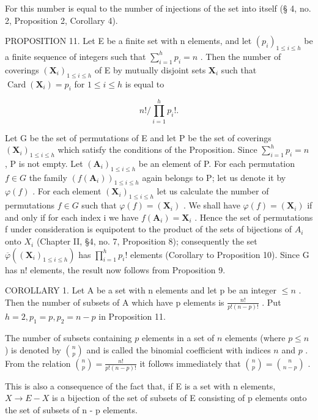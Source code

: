 For this number is equal to the number of injections of the set into itself (§ 4, no. 2, Proposition 2, Corollary 4).

PROPOSITION 11. Let E be a finite set with n elements, and let \((p_i)_{1 \leqslant i \leqslant h}\) be a finite sequence of integers such that \(\sum_{i=1}^{h} p_i = n\) . Then the number of coverings \((\mathbf{X}_i)_{1 \leqslant i \leqslant h}\) of E by mutually disjoint sets \(\mathbf{X}_i\) such that \(\operatorname{Card}(\mathbf{X}_i) = p_i\) for \(1 \leqslant i \leqslant h\) is equal to

\[
n! / \prod_ {i = 1} ^ {h} p _ {i}!.
\]

Let G be the set of permutations of E and let P be the set of coverings \((\mathbf{X}_{i})_{1\leqslant i\leqslant h}\) which satisfy the conditions of the Proposition. Since \(\sum_{i=1}^{h}p_{i}=n\) , P is not empty. Let \((\mathbf{A}_{i})_{1\leqslant i\leqslant h}\) be an element of P. For each permutation \(f\in G\) the family \((f(\mathbf{A}_{i}))_{1\leqslant i\leqslant h}\) again belongs to P; let us denote it by \(\varphi(f)\) . For each element \((\mathbf{X}_{i})_{1\leqslant i\leqslant h}\) let us calculate the number of permutations \(f\in G\) such that \(\varphi(f)=(\mathbf{X}_{i})\) . We shall have \(\varphi(f)=(\mathbf{X}_{i})\) if and only if for each index i we have \(f(\mathbf{A}_{i})=\mathbf{X}_{i}\) . Hence the set of permutations f under consideration is equipotent to the product of the sets of bijections of \(A_{i}\) onto \(X_{i}\) (Chapter II, §4, no. 7, Proposition 8); consequently the set \(\overline{\varphi}((\mathbf{X}_{i})_{1\leqslant i\leqslant h})\) has \(\prod_{i=1}^{h}p_{i}!\) elements (Corollary to Proposition 10). Since G has n! elements, the result now follows from Proposition 9.

COROLLARY 1. Let A be a set with n elements and let p be an integer \(\leqslant n\) . Then the number of subsets of A which have p elements is \(\frac{n!}{p!(n-p)!}\) . Put \(h=2, p_{1}=p, p_{2}=n-p\) in Proposition 11.

The number of subsets containing \(p\) elements in a set of \(n\) elements (where \(p \leqslant n\) ) is denoted by \(\binom{n}{p}\) and is called the binomial coefficient with indices \(n\) and \(p\) . From the relation \(\binom{n}{p} = \frac{n!}{p!(n - p)!}\) it follows immediately that \(\binom{n}{p} = \binom{n}{n - p}\) .

This is also a consequence of the fact that, if E is a set with n elements, \(X \rightarrow E - X\) is a bijection of the set of subsets of E consisting of p elements onto the set of subsets of n - p elements.

